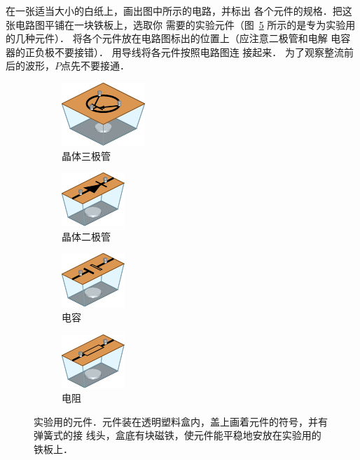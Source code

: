 在一张适当大小的白纸上，画出图中所示的电路，并标出
各个元件的规格．把这张电路图平铺在一块铁板上，选取你
需要的实验元件（图~\ref{fig_C_10-5} 所示的是专为实验用的几种元件）．
将各个元件放在电路图标出的位置上（应注意二极管和电解
电容器的正负极不要接错）．
用导线将各元件按照电路图连
接起来．
为了观察整流前后的波形，$P$点先不要接通．

\begin{figure}[htbp]
    \centering
    \begin{subfigure}{0.3\linewidth}
        \centering
        \includegraphics{fig/C/10-5a.pdf}
        \caption{晶体三极管}\label{fig_C_10-5a}
    \end{subfigure}
    \hfil
    \begin{subfigure}{0.2\linewidth}
        \centering
        \includegraphics{fig/C/10-5b.pdf}
        \caption{晶体二极管}\label{fig_C_10-5b}
    \end{subfigure}
    \hfil
    \begin{subfigure}{0.2\linewidth}
        \centering
        \includegraphics{fig/C/10-5c.pdf}
        \caption{电容}\label{fig_C_10-5c}
    \end{subfigure}
    \hfil
    \begin{subfigure}{0.2\linewidth}
        \centering
        \includegraphics{fig/C/10-5d.pdf}
        \caption{电阻}\label{fig_C_10-5d}
    \end{subfigure}
    \caption{实验用的元件．元件装在透明塑料盒内，盖上画着元件的符号，并有弹簧式的接
    线头，盒底有块磁铁，使元件能平稳地安放在实验用的铁板上．}\label{fig_C_10-5}
\end{figure}

